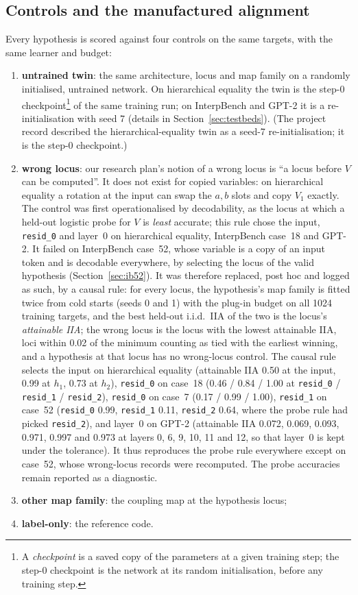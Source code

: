 \documentclass[11pt,a4paper]{article}
\begin{document}
\subsection{Controls and the manufactured alignment}
\label{sec:score:controls}

Every hypothesis is scored against four controls on the same targets, with the same learner and budget:
\begin{enumerate}
\item \textbf{untrained twin}: the same architecture, locus and map family on a randomly initialised, untrained network. On hierarchical equality the twin is the step-0 checkpoint\footnote{A \emph{checkpoint} is a saved copy of the parameters at a given training step; the step-0 checkpoint is the network at its random initialisation, before any training step.} of the same training run; on InterpBench and GPT-2 it is a re-initialisation with seed 7 (details in Section~\ref{sec:testbeds}). (The project record described the hierarchical-equality twin as a seed-7 re-initialisation; it is the step-0 checkpoint.)
\item \textbf{wrong locus}: our research plan's notion of a wrong locus is ``a locus before $V$ can be computed''. It does not exist for copied variables: on hierarchical equality a rotation at the input can swap the $a,b$ slots and copy $V_1$ exactly. The control was first operationalised by decodability, as the locus at which a held-out logistic probe for $V$ is \emph{least} accurate; this rule chose the input, \texttt{resid\_0} and layer~0 on hierarchical equality, InterpBench case~18 and GPT-2. It failed on InterpBench case~52, whose variable is a copy of an input token and is decodable everywhere, by selecting the locus of the valid hypothesis (Section~\ref{sec:ib52}). It was therefore replaced, post hoc and logged as such, by a causal rule: for every locus, the hypothesis's map family is fitted twice from cold starts (seeds 0 and 1) with the plug-in budget on all 1024 training targets, and the best held-out i.i.d.\ IIA of the two is the locus's \emph{attainable IIA}; the wrong locus is the locus with the lowest attainable IIA, loci within 0.02 of the minimum counting as tied with the earliest winning, and a hypothesis at that locus has no wrong-locus control. The causal rule selects the input on hierarchical equality (attainable IIA 0.50 at the input, 0.99 at $h_1$, 0.73 at $h_2$), \texttt{resid\_0} on case~18 (0.46 / 0.84 / 1.00 at \texttt{resid\_0} / \texttt{resid\_1} / \texttt{resid\_2}), \texttt{resid\_0} on case~7 (0.17 / 0.99 / 1.00), \texttt{resid\_1} on case~52 (\texttt{resid\_0} 0.99, \texttt{resid\_1} 0.11, \texttt{resid\_2} 0.64, where the probe rule had picked \texttt{resid\_2}), and layer~0 on GPT-2 (attainable IIA 0.072, 0.069, 0.093, 0.971, 0.997 and 0.973 at layers 0, 6, 9, 10, 11 and 12, so that layer~0 is kept under the tolerance). It thus reproduces the probe rule everywhere except on case~52, whose wrong-locus records were recomputed. The probe accuracies remain reported as a diagnostic.
\item \textbf{other map family}: the coupling map at the hypothesis locus;
\item \textbf{label-only}: the reference code.
\end{enumerate}
\end{document}
